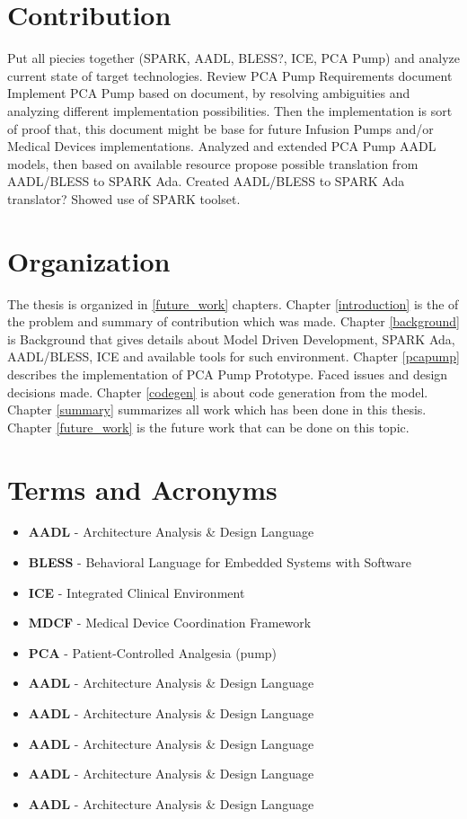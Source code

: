 \section{Contribution}
\label{introduction:contribution}
Put all piecies together (SPARK, AADL, BLESS?, ICE, PCA Pump) and analyze current state of target technologies.
Review PCA Pump Requirements document
Implement PCA Pump based on document, by resolving ambiguities and analyzing different implementation possibilities. Then the implementation is sort of proof that, this document might be base for future Infusion Pumps and/or Medical Devices implementations.
Analyzed and extended PCA Pump AADL models, then based on available resource propose possible translation from AADL/BLESS to SPARK Ada.
Created AADL/BLESS to SPARK Ada translator?
Showed use of SPARK toolset.


\section{Organization}
\label{introduction:organization}
The thesis is organized in \ref{future_work} chapters. 
Chapter \ref{introduction} is the of the problem and summary of contribution which was made. 
Chapter \ref{background} is Background that gives details about Model Driven Development, SPARK Ada, AADL/BLESS, ICE and available tools for such environment. 
Chapter \ref{pcapump} describes the implementation of PCA Pump Prototype. Faced issues and design decisions made.
Chapter \ref{codegen} is about code generation from the model. 
Chapter \ref{summary} summarizes all work which has been done in this thesis. 
Chapter \ref{future_work} is the future work that can be done on this topic.


\section{Terms and Acronyms}
\label{introduction:terms}

\begin{itemize}
	\item \textbf{AADL} - Architecture Analysis \& Design Language
	\item \textbf{BLESS} - Behavioral Language for Embedded Systems with Software
	\item \textbf{ICE} - Integrated Clinical Environment
	\item \textbf{MDCF} - Medical Device Coordination Framework
	\item \textbf{PCA} - Patient-Controlled Analgesia (pump)
	\item \textbf{AADL} - Architecture Analysis \& Design Language
	\item \textbf{AADL} - Architecture Analysis \& Design Language
	\item \textbf{AADL} - Architecture Analysis \& Design Language
	\item \textbf{AADL} - Architecture Analysis \& Design Language
	\item \textbf{AADL} - Architecture Analysis \& Design Language
\end{itemize}